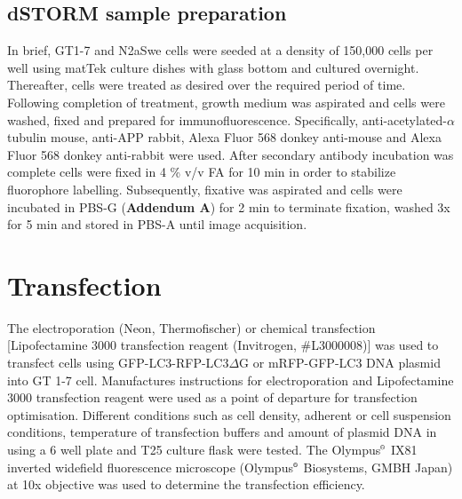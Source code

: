 \subsection{dSTORM sample preparation}
In brief, GT1-7 and N2aSwe cells were seeded at a density of 150,000 cells per well using matTek culture dishes with glass bottom and cultured overnight. Thereafter, cells were treated as desired over the required period of time. Following completion of treatment, growth medium was aspirated and cells were washed, fixed and prepared for immunofluorescence. Specifically, anti-acetylated-$\alpha$ tubulin mouse, anti-APP rabbit, Alexa Fluor 568 donkey anti-mouse and Alexa Fluor 568 donkey anti-rabbit were used. After secondary antibody incubation was complete cells were fixed in 4 \% v/v FA for 10 min in order to stabilize fluorophore labelling. Subsequently, fixative was aspirated and cells were incubated in PBS-G (\textbf{Addendum A}) for 2 min to terminate fixation, washed 3x for 5 min and stored in PBS-A until image acquisition. 

\section{Transfection}\label{sec:transfection}
The electroporation (Neon, Thermofischer) or chemical transfection [Lipofectamine 3000 transfection reagent (Invitrogen, \#L3000008)] was used to transfect cells using GFP-LC3-RFP-LC3$\Delta$G or mRFP-GFP-LC3 DNA plasmid into GT 1-7 cell. Manufactures instructions for electroporation and Lipofectamine 3000 transfection reagent were used as a point of departure for transfection optimisation. Different conditions such as cell density, adherent or cell suspension conditions, temperature of transfection buffers and amount of plasmid DNA in using a 6 well plate and T25 culture flask were tested. The Olympus${\textsuperscript{\tiny{\textregistered}}}$ IX81 inverted widefield fluorescence microscope (Olympus${\textsuperscript{\tiny{\textregistered}}}$ Biosystems, GMBH Japan) at 10x objective was used to determine the transfection efficiency.

